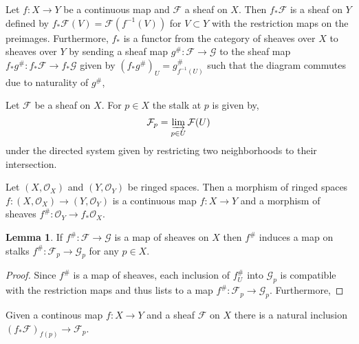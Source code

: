 \documentclass[12pt]{extarticle}
\theoremstyle{definition}
\newtheorem{lemma}[theorem]{Lemma}
\newenvironment{definition}[1][Definition:]{\begin{trivlist}
\item[\hskip \labelsep {\bfseries #1}]}{\end{trivlist}}
\newcommand{\res}{\mathrm{res}}
\newcommand{\F}{\mathcal{F}}
\newcommand{\G}{\mathcal{G}}
\renewcommand{\O}{\mathcal{O}}
\begin{document}
\begin{definition}
Let $f : X \to Y$ be a continuous map and $\F$ a sheaf on $X$. Then $f_* \F$ is a sheaf on $Y$ defined by $f_* \F(V) = \F(f^{-1}(V))$ for $V \subset Y$ with the restriction maps on the preimages. Furthermore, $f_*$ is a functor from the category of sheaves over $X$ to sheaves over $Y$ by sending a sheaf map $g^{\#} : \F \to \G$ to the sheaf map $f_* g^{\#} : f_* \F \to f_* \G$ given by $(f_* g^{\#})_U = g^{\#}_{f^{-1}(U)}$ such that the diagram commutes due to naturality of $g^{\#}$,
\begin{center}
\end{center}   
\end{definition}

\begin{definition}
Let $\F$ be a sheaf on $X$. For $p \in X$ the stalk at $p$ is given by,
\[ \F_p = \varinjlim_{p \in U} \F(U) \]
under the directed system given by restricting two neighborhoods to their intersection. 
\end{definition}

\begin{definition}
Let $(X, \O_X)$ and $(Y, \O_Y)$ be ringed spaces. Then a morphism of ringed spaces $f : (X, \O_X) \to (Y, \O_Y)$ is a continuous map $f : X \to Y$ and a morphism of sheaves $f^{\#} : \O_Y \to f_* \O_X$. 
\end{definition}

\begin{lemma}
If $f^{\#} : \F \to \G$ is a map of sheaves on $X$ then $f^{\#}$ induces a map on stalks $f^{\#} : \F_p \to \G_p$ for any $p \in X$. 
\end{lemma}

\begin{proof}
Since $f^{\#}$ is a map of sheaves, each inclusion of $f^{\#}_U$ into $\G_p$ is compatible with the restriction maps and thus lists to a map $f^{\#} : \F_p \to \G_p$. Furthermore, 
\end{proof}

\begin{definition}
Given a continous map $f : X \to Y$ and a sheaf $\F$ on $X$ there is a natural inclusion $(f_* \F)_{f(p)} \to \F_{p}$. 
\end{definition}
\end{document}

